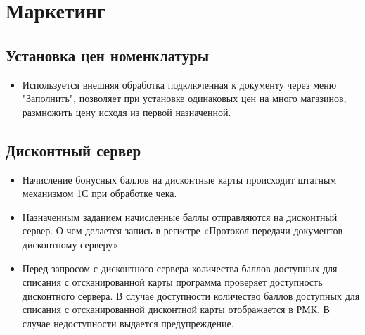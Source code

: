 \section{Маркетинг}
\subsection{Установка цен номенклатуры}


\begin{itemize}
	\item Используется внешняя обработка подключенная к документу через меню "Заполнить", позволяет при установке одинаковых цен на много магазинов, размножить цену исходя из первой назначенной.
\end{itemize}


\subsection{Дисконтный сервер}

\begin{itemize}
	\item Начисление бонусных баллов на дисконтные карты происходит штатным механизмом 1С
	при обработке чека.
	\item  Назначенным заданием начисленные баллы  отправляются на дисконтный сервер.
	О чем делается запись в регистре «Протокол передачи документов дисконтному серверу»
	\item Перед запросом с дисконтного сервера количества баллов доступных для списания с отсканированной
	карты программа проверяет доступность дисконтного сервера. В случае доступности количество баллов
	доступных для списания с отсканированной дисконтной карты отображается в РМК. В случае недоступности
	выдается предупреждение.  
\end{itemize}
